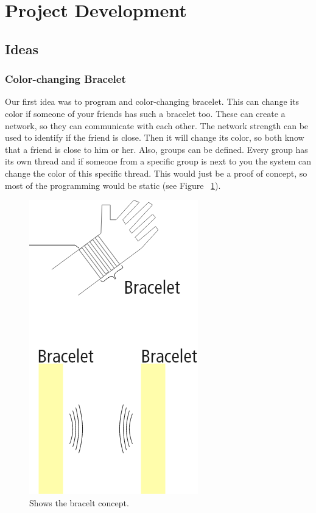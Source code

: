\documentclass[doc.tex]{subfiles}
\begin{document}
    \section{Project Development}
    \subsection{Ideas}
    \subsubsection{Color-changing Bracelet}
    \begin{flushleft}
        Our first idea was to program and color-changing bracelet. This can change its color if someone of your
        friends has such a bracelet too. These can create a network, so they can communicate with each other. The
        network strength can be used to identify if the friend is close. Then it will change its color, so both know
        that a friend is close to him or her. Also, groups can be defined. Every group has its own thread and if someone 
        from a specific group is next to you the system can change the color of this specific thread. This would just 
        be a proof of concept, so most of the programming would be static (see Figure ~\ref{fig:braceltIdea}).
    \end{flushleft}

    \begin{figure}[h!]
        \centering
        \includegraphics[scale=0.4]{images/projectideas/bracelt.png}
        \caption{Shows the bracelt concept.}
        \label{fig:braceltIdea}
    \end{figure}
\end{document}
